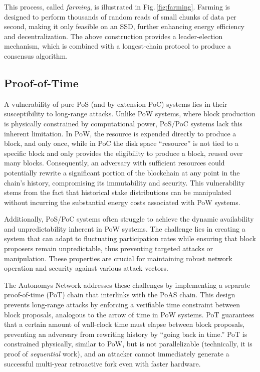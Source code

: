 \documentclass[conference]{IEEEtran}
\begin{document}
This process, called \textit{farming}, is illustrated in Fig.\,\ref{fig:farming}. Farming is designed to perform thousands of random reads of small chunks of data per second, making it only feasible on an SSD, further enhancing energy efficiency \cite{ssdvshdd} and decentralization. The above construction provides a leader-election mechanism, which is combined with a longest-chain protocol to produce a consensus algorithm.

\subsection{Proof-of-Time}
\label{sec:pot}
A vulnerability of pure PoS (and by extension PoC) systems lies in their susceptibility to long-range attacks\cite{bagaria2020}. Unlike PoW systems, where block production is physically constrained by computational power, PoS/PoC systems lack this inherent limitation. In PoW, the resource is expended directly to produce a block, and only once, while in PoC the disk space ``resource'' is not tied to a specific block and only provides the eligibility to produce a block, reused over many blocks. Consequently, an adversary with sufficient resources could potentially rewrite a significant portion of the blockchain at any point in the chain's history, compromising its immutability and security. This vulnerability stems from the fact that historical stake distributions can be manipulated without incurring the substantial energy costs associated with PoW systems.

Additionally, PoS/PoC systems often struggle to achieve the dynamic availability and unpredictability inherent in PoW systems\cite{posat}. The challenge lies in creating a system that can adapt to fluctuating participation rates while ensuring that block proposers remain unpredictable, thus preventing targeted attacks or manipulation. These properties are crucial for maintaining robust network operation and security against various attack vectors.

The Autonomys Network addresses these challenges by implementing a separate proof-of-time (PoT) chain that interlinks with the PoAS chain. This design prevents long-range attacks by enforcing a verifiable time constraint between block proposals, analogous to the arrow of time\cite{posat} in PoW systems. PoT guarantees that a certain amount of wall-clock time must elapse between block proposals, preventing an adversary from rewriting history by ``going back in time.'' PoT is constrained physically, similar to PoW, but is not parallelizable (technically, it is proof of \textit{sequential} work), and an attacker cannot immediately generate a successful multi-year retroactive fork even with faster hardware.
\end{document}
